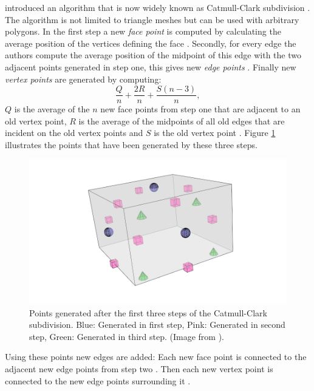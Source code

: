 \citeauthor{CATMULL1978350} introduced an algorithm that is now widely known as Catmull-Clark subdivision \cite{CATMULL1978350}.
The algorithm is not limited to triangle meshes but can be used with arbitrary polygons.
In the first step a new \textit{face point} is computed by calculating the average position of the vertices defining the face \cite{CATMULL1978350}.
Secondly, for every edge the authors compute the average position of the midpoint of this edge with the two adjacent points generated in step one, this gives new \textit{edge points} \cite{CATMULL1978350}.
Finally new \textit{vertex points} are generated by computing:
\begin{equation*}
	\frac{Q}{n} + \frac{2R}{n} + \frac{S(n-3)}{n},
\end{equation*}
$Q$ is the average of the $n$ new face points from step one that are adjacent to an old vertex point, $R$ is the average of the midpoints of all old edges that are incident on the old vertex points and $S$ is the old vertex point \cite{CATMULL1978350}.
Figure \ref{fig:catmull_clark_new_points} illustrates the points that have been generated by these three steps.
\begin{figure}[ht]
    \centering
    \includegraphics[width=0.5\linewidth]{img/catmull_clark_new_points.png}
    \caption[Points generated by the Catmull-Clark subdivision]{Points generated after the first three steps of the Catmull-Clark subdivision. Blue: Generated in first step, Pink: Generated in second step, Green: Generated in third step. (Image from \cite{catmull_clark_step_3}).}
    \label{fig:catmull_clark_new_points}
\end{figure}
Using these points new edges are added: Each new face point is connected to the adjacent new edge points from step two \cite{CATMULL1978350}.
Then each new vertex point is connected to the new edge points surrounding it \cite{CATMULL1978350}.


